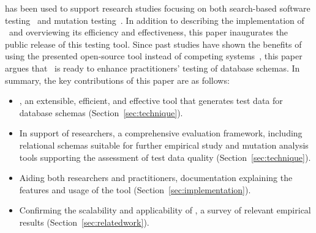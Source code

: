
{\sa} has been used to support research studies focusing on both search-based software
testing~\cite{kapfhammer2013search,mcminn2015effectiveness,kinneer2015automatically} and mutation
testing~\cite{wright2013efficient,wright2014impact,wright2015mutation,mcminn2016virtual}.  In addition to describing the
implementation of \sa~and overviewing its efficiency and effectiveness, this paper inaugurates the public release of
this testing tool. Since past studies have shown the benefits of using the presented open-source tool instead of
competing systems~\cite{kapfhammer2013search}, this paper argues that \sa~is ready to enhance practitioners' testing of
database schemas.  In summary, the key contributions of this paper are as follows:


\begin{itemize}


  \item {\sa}, an extensible, efficient, and effective tool that generates test data for database schemas
    (Section~\ref{sec:technique}).


  \item In support of researchers, a comprehensive evaluation framework, including relational schemas suitable for
    further empirical study and mutation analysis tools supporting the assessment of test data quality
    (Section~\ref{sec:technique}).


  \item Aiding both researchers and practitioners, documentation explaining the features and usage of the tool
    (Section~\ref{sec:implementation}).


  \item Confirming the scalability and applicability of \sa, a survey of relevant empirical results
    (Section~\ref{sec:relatedwork}).

\end{itemize}
